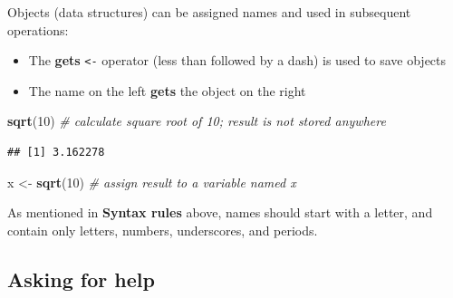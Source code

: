 \documentclass[
]{book}
\newenvironment{Shaded}{\begin{snugshade}}{\end{snugshade}}
\newcommand{\CommentTok}[1]{\textcolor[rgb]{0.56,0.35,0.01}{\textit{#1}}}
\newcommand{\DecValTok}[1]{\textcolor[rgb]{0.00,0.00,0.81}{#1}}
\newcommand{\KeywordTok}[1]{\textcolor[rgb]{0.13,0.29,0.53}{\textbf{#1}}}
\newcommand{\NormalTok}[1]{#1}
\newcommand{\StringTok}[1]{\textcolor[rgb]{0.31,0.60,0.02}{#1}}
\providecommand{\tightlist}{%
  \setlength{\itemsep}{0pt}\setlength{\parskip}{0pt}}
\begin{document}
Objects (data structures) can be assigned names and used in subsequent operations:

\begin{itemize}
\tightlist
\item
  The \textbf{gets} \texttt{\textless{}-} operator (less than followed by a dash) is used to save objects
\item
  The name on the left \textbf{gets} the object on the right
\end{itemize}

\begin{Shaded}
\begin{Highlighting}[]
\KeywordTok{sqrt}\NormalTok{(}\DecValTok{10}\NormalTok{) }\CommentTok{\# calculate square root of 10; result is not stored anywhere}
\end{Highlighting}
\end{Shaded}

\begin{verbatim}
## [1] 3.162278
\end{verbatim}

\begin{Shaded}
\begin{Highlighting}[]
\NormalTok{x \textless{}{-}}\StringTok{ }\KeywordTok{sqrt}\NormalTok{(}\DecValTok{10}\NormalTok{) }\CommentTok{\# assign result to a variable named x}
\end{Highlighting}
\end{Shaded}

As mentioned in \textbf{Syntax rules} above, names should start with a letter, and contain only letters, numbers, underscores, and periods.

\hypertarget{asking-for-help}{%
\subsection{Asking for help}\label{asking-for-help}}
\end{document}
